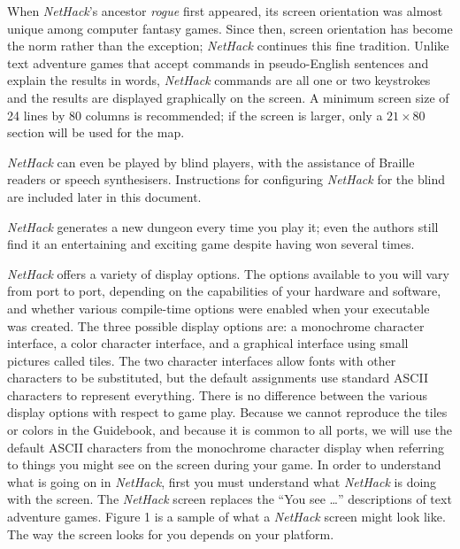 \documentclass[titlepage]{article}
\begin{document}
When \textit{NetHack}'s ancestor \textit{rogue} first appeared, its screen
orientation was almost unique among computer fantasy games.  Since
then, screen orientation has become the norm rather than the
exception; \textit{NetHack} continues this fine tradition.  Unlike text
adventure games that accept commands in pseudo-English sentences and
explain the results in words, \textit{NetHack} commands are all one or two
keystrokes and the results are displayed graphically on the screen.  A
minimum screen size of 24 lines by 80 columns is recommended; if the
screen is larger, only a $21\times80$ section will be used for the map.

\textit{NetHack} can even be played by blind players, with the assistance of
Braille readers or speech synthesisers.  Instructions for configuring
\textit{NetHack} for the blind are included later in this document.

\textit{NetHack} generates a new dungeon every time you play it; even the
authors still find it an entertaining and exciting game despite
having won several times.

\textit{NetHack} offers a variety of display options.  The options available to
you will vary from port to port, depending on the capabilities of your
hardware and software, and whether various compile-time options were
enabled when your executable was created.  The three possible display
options are: a monochrome character interface, a color character interface,
and a graphical interface using small pictures called tiles.  The two
character interfaces allow fonts with other characters to be substituted,
but the default assignments use standard ASCII characters to represent
everything.  There is no difference between the various display options
with respect to game play.  Because we cannot reproduce the tiles or
colors in the Guidebook, and because it is common to all ports, we will
use the default ASCII characters from the monochrome character display
when referring to things you might see on the screen during your game.
In order to understand what is going on in \textit{NetHack}, first you must
understand what \textit{NetHack} is doing with the screen.  The \textit{NetHack}
screen replaces the ``You see \ldots'' descriptions of text adventure games.
Figure 1 is a sample of what a \textit{NetHack} screen might look like.
The way the screen looks for you depends on your platform.
\end{document}
